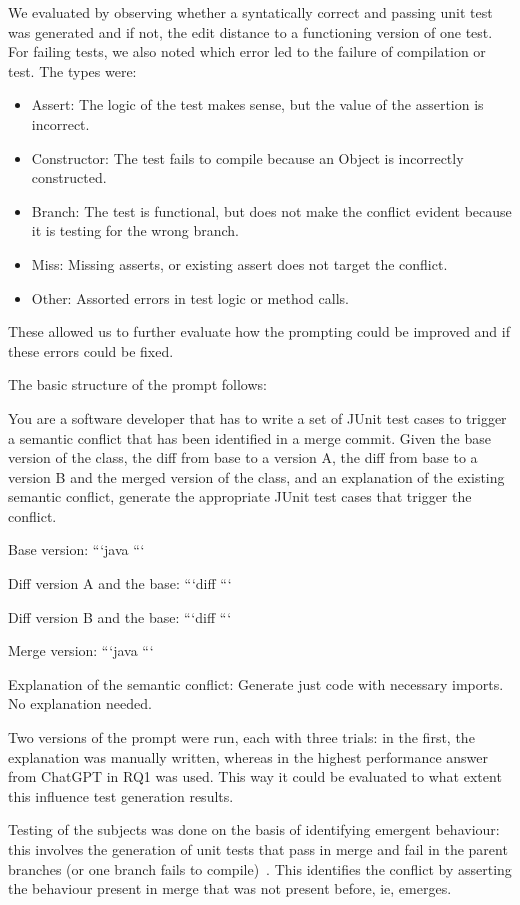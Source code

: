 We evaluated by observing whether a syntatically correct and passing unit test was generated and if not, the edit distance to a functioning version of one test. For failing tests, we also noted which error led to the failure of compilation or test. The types were:
\begin{itemize}
  \item Assert: The logic of the test makes sense, but the value of the assertion is incorrect.
  \item Constructor: The test fails to compile because an Object is incorrectly constructed.
  \item Branch: The test is functional, but does not make the conflict evident because it is testing for the wrong branch.
  \item Miss: Missing asserts, or existing assert does not target the conflict.
  \item Other: Assorted errors in test logic or method calls.
\end{itemize}
These allowed us to further evaluate how the prompting could be improved and if these errors could be fixed.

The basic structure of the prompt follows:
\begin{prompt}
You are a software developer that has to write a set of JUnit test cases to trigger a semantic conflict that has been identified in a merge commit.
Given the base version of the class, the diff from base to a version A, the diff from base to a version B and the merged version of the class, and an explanation of the existing semantic conflict, generate the appropriate JUnit test cases that trigger the conflict.

Base version:
```java
```

Diff version A and the base:
```diff
```

Diff version B and the base:
```diff
```

Merge version:
```java
```

Explanation of the semantic conflict:
Generate just code with necessary imports. No explanation needed.
\end{prompt}
Two versions of the prompt were run, each with three trials: in the first, the explanation was manually written, whereas in the highest performance answer from ChatGPT in RQ1 was used.
This way it could be evaluated to what extent this influence test generation results.

Testing of the subjects was done on the basis of identifying emergent behaviour: this involves the generation of unit tests that
pass in merge and fail in the parent branches (or one branch fails to compile)~\citep{kn:nuno}. This identifies the conflict by
asserting the behaviour present in merge that was not present before, ie, emerges.

